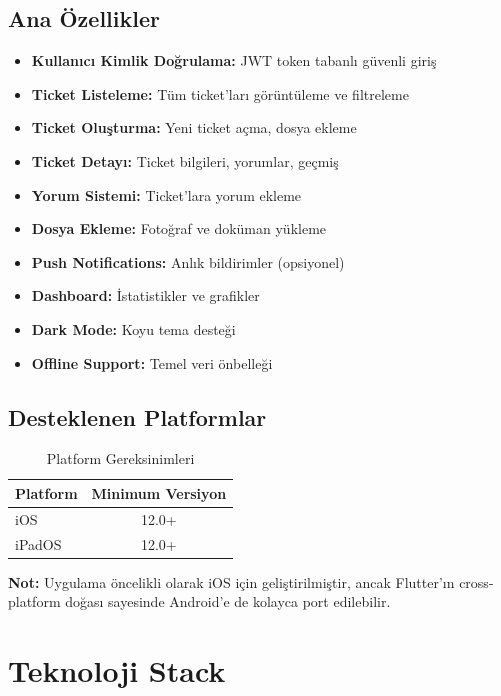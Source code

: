 \documentclass[12pt,a4paper]{article}
\begin{document}
\subsection{Ana Özellikler}

\begin{itemize}
    \item \textbf{Kullanıcı Kimlik Doğrulama:} JWT token tabanlı güvenli giriş
    \item \textbf{Ticket Listeleme:} Tüm ticket'ları görüntüleme ve filtreleme
    \item \textbf{Ticket Oluşturma:} Yeni ticket açma, dosya ekleme
    \item \textbf{Ticket Detayı:} Ticket bilgileri, yorumlar, geçmiş
    \item \textbf{Yorum Sistemi:} Ticket'lara yorum ekleme
    \item \textbf{Dosya Ekleme:} Fotoğraf ve doküman yükleme
    \item \textbf{Push Notifications:} Anlık bildirimler (opsiyonel)
    \item \textbf{Dashboard:} İstatistikler ve grafikler
    \item \textbf{Dark Mode:} Koyu tema desteği
    \item \textbf{Offline Support:} Temel veri önbelleği
\end{itemize}

\subsection{Desteklenen Platformlar}

\begin{table}[h]
\centering
\begin{tabular}{|l|c|}
\hline
\textbf{Platform} & \textbf{Minimum Versiyon} \\
\hline
iOS & 12.0+ \\
iPadOS & 12.0+ \\
\hline
\end{tabular}
\caption{Platform Gereksinimleri}
\end{table}

\textbf{Not:} Uygulama öncelikli olarak iOS için geliştirilmiştir, ancak Flutter'ın cross-platform doğası sayesinde Android'e de kolayca port edilebilir.

\newpage

\section{Teknoloji Stack}
\end{document}
